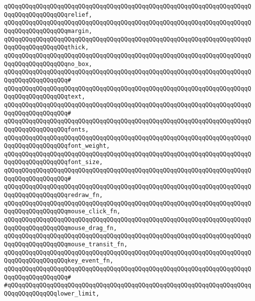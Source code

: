 \verb|qQQqqQQqqQQqqQQqqQQqqQQqqQQqqQQqqQQqqQQqqQQqqQQqqQQqqQQqqQQqqQQqqQQqqQQqqQQqqQQqqQQqqQQqrelief,|\newline
\verb|qQQqqQQqqQQqqQQqqQQqqQQqqQQqqQQqqQQqqQQqqQQqqQQqqQQqqQQqqQQqqQQqqQQqqQQqqQQqqQQqqQQqqQQqmargin,|\newline
\verb|qQQqqQQqqQQqqQQqqQQqqQQqqQQqqQQqqQQqqQQqqQQqqQQqqQQqqQQqqQQqqQQqqQQqqQQqqQQqqQQqqQQqqQQqthick,|\newline
\verb|qQQqqQQqqQQqqQQqqQQqqQQqqQQqqQQqqQQqqQQqqQQqqQQqqQQqqQQqqQQqqQQqqQQqqQQqqQQqqQQqqQQqqQQqno_box,|\newline
\verb|qQQqqQQqqQQqqQQqqQQqqQQqqQQqqQQqqQQqqQQqqQQqqQQqqQQqqQQqqQQqqQQqqQQqqQQqqQQqqQQqqQQqqQQq#|\newline
\verb|qQQqqQQqqQQqqQQqqQQqqQQqqQQqqQQqqQQqqQQqqQQqqQQqqQQqqQQqqQQqqQQqqQQqqQQqqQQqqQQqqQQqqQQqtext,|\newline
\verb|qQQqqQQqqQQqqQQqqQQqqQQqqQQqqQQqqQQqqQQqqQQqqQQqqQQqqQQqqQQqqQQqqQQqqQQqqQQqqQQqqQQqqQQq#|\newline
\verb|qQQqqQQqqQQqqQQqqQQqqQQqqQQqqQQqqQQqqQQqqQQqqQQqqQQqqQQqqQQqqQQqqQQqqQQqqQQqqQQqqQQqqQQqfonts,|\newline
\verb|qQQqqQQqqQQqqQQqqQQqqQQqqQQqqQQqqQQqqQQqqQQqqQQqqQQqqQQqqQQqqQQqqQQqqQQqqQQqqQQqqQQqqQQqfont_weight,|\newline
\verb|qQQqqQQqqQQqqQQqqQQqqQQqqQQqqQQqqQQqqQQqqQQqqQQqqQQqqQQqqQQqqQQqqQQqqQQqqQQqqQQqqQQqqQQqfont_size,|\newline
\verb|qQQqqQQqqQQqqQQqqQQqqQQqqQQqqQQqqQQqqQQqqQQqqQQqqQQqqQQqqQQqqQQqqQQqqQQqqQQqqQQqqQQqqQQq#|\newline
\verb|qQQqqQQqqQQqqQQqqQQqqQQqqQQqqQQqqQQqqQQqqQQqqQQqqQQqqQQqqQQqqQQqqQQqqQQqqQQqqQQqqQQqqQQqredraw_fn,|\newline
\verb|qQQqqQQqqQQqqQQqqQQqqQQqqQQqqQQqqQQqqQQqqQQqqQQqqQQqqQQqqQQqqQQqqQQqqQQqqQQqqQQqqQQqqQQqmouse_click_fn,|\newline
\verb|qQQqqQQqqQQqqQQqqQQqqQQqqQQqqQQqqQQqqQQqqQQqqQQqqQQqqQQqqQQqqQQqqQQqqQQqqQQqqQQqqQQqqQQqmouse_drag_fn,|\newline
\verb|qQQqqQQqqQQqqQQqqQQqqQQqqQQqqQQqqQQqqQQqqQQqqQQqqQQqqQQqqQQqqQQqqQQqqQQqqQQqqQQqqQQqqQQqmouse_transit_fn,|\newline
\verb|qQQqqQQqqQQqqQQqqQQqqQQqqQQqqQQqqQQqqQQqqQQqqQQqqQQqqQQqqQQqqQQqqQQqqQQqqQQqqQQqqQQqqQQqkey_event_fn,|\newline
\verb|qQQqqQQqqQQqqQQqqQQqqQQqqQQqqQQqqQQqqQQqqQQqqQQqqQQqqQQqqQQqqQQqqQQqqQQqqQQqqQQqqQQqqQQq#|\newline
\verb|#qQQqqQQqqQQqqQQqqQQqqQQqqQQqqQQqqQQqqQQqqQQqqQQqqQQqqQQqqQQqqQQqqQQqqQQqqQQqqQQqqQQqlower_limit,|\newline
